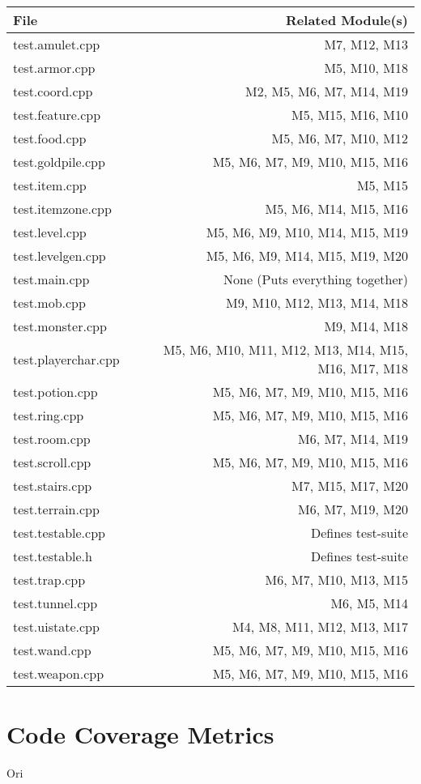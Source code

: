 \documentclass[12pt, titlepage]{article}
\begin{document}
	\begin{table}[h]
		\caption{\bf Test-Module Trace}
		\label{TblMH}
		\bigskip
		\centering
		\def\arraystretch{1.2}
			\begin{longtable}{lr}
				\hline
				File & Related Module(s)\\
				\hline
				test.amulet.cpp 		& M7, M12, M13\\
				test.armor.cpp 			& M5, M10, M18\\
				test.coord.cpp 			& M2, M5, M6, M7, M14, M19\\
				test.feature.cpp 		& M5, M15, M16, M10\\
				test.food.cpp 			& M5, M6, M7, M10, M12\\
				test.goldpile.cpp 		& M5, M6, M7, M9, M10, M15, M16\\
				test.item.cpp 			& M5, M15\\
				test.itemzone.cpp 		& M5, M6, M14, M15, M16\\
				test.level.cpp 			& M5, M6, M9, M10, M14, M15, M19\\
				test.levelgen.cpp 		& M5, M6, M9, M14, M15, M19, M20\\
				test.main.cpp 			& None (Puts everything together)\\
				test.mob.cpp 			& M9, M10, M12, M13, M14, M18\\
				test.monster.cpp 		& M9, M14, M18\\
				test.playerchar.cpp 	& M5, M6, M10, M11, M12, M13, M14, M15, M16, M17, M18\\
				test.potion.cpp 		& M5, M6, M7, M9, M10, M15, M16\\
				test.ring.cpp 			& M5, M6, M7, M9, M10, M15, M16\\
				test.room.cpp 			& M6, M7, M14, M19\\
				test.scroll.cpp 		& M5, M6, M7, M9, M10, M15, M16\\
				test.stairs.cpp 		& M7, M15, M17, M20\\
				test.terrain.cpp 		& M6, M7, M19, M20\\
				test.testable.cpp 		& Defines test-suite\\
				test.testable.h 		& Defines test-suite\\
				test.trap.cpp 			& M6, M7, M10, M13, M15\\
				test.tunnel.cpp 		& M6, M5, M14\\
				test.uistate.cpp 		& M4, M8, M11, M12, M13, M17\\
				test.wand.cpp 			& M5, M6, M7, M9, M10, M15, M16\\
				test.weapon.cpp 		& M5, M6, M7, M9, M10, M15, M16\\
				\hline
			\end{longtable}
	\end{table}



\section{Code Coverage Metrics}
	Ori




\end{document}
